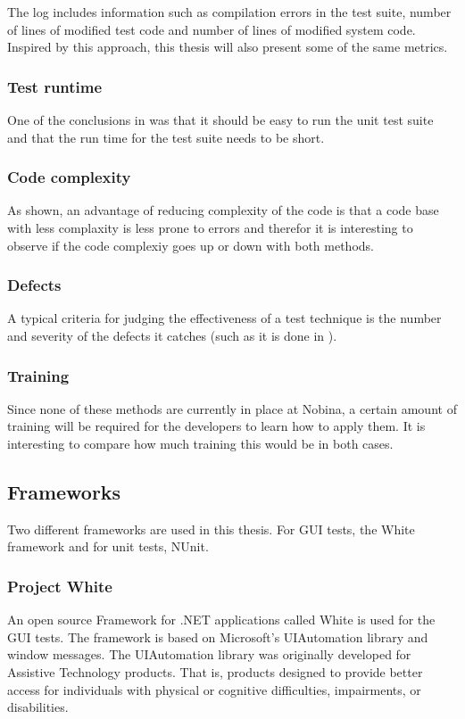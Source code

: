\documentclass{article}
\begin{document}
			The log includes information such as compilation errors in the test
			suite, number of lines of modified test code and number of lines of modified system code. Inspired by this approach, this thesis will also present some of the same metrics.

			\subsubsection{Test runtime}
			One of the conclusions in \cite{unit} was that it should be easy to run the unit test suite and that the run time for the test suite needs to be short. 

			\subsubsection{Code complexity}
			As shown, an advantage of reducing complexity of the code is that a code base with less complaxity is less prone to errors and therefor it is interesting to observe if the code complexiy goes up or down with both methods.   

			\subsubsection{Defects}
			A typical criteria for judging the effectiveness of a test technique is the number and severity of the defects it catches (such as it is done in \cite{unit}). 

			\subsubsection{Training}
			Since none of these methods are currently in place at Nobina, a certain amount of training will be required for the developers to learn how to apply them. It is interesting to compare how much training this would be in both cases.

		\subsection{Frameworks}

			Two different frameworks are used in this thesis. For GUI tests, the White framework and for unit tests, NUnit. 

			\subsubsection{Project White}
			An open source Framework for .NET applications called White is used for the GUI tests. The framework is based on Microsoft's UIAutomation library and window messages. The UIAutomation library was originally developed for Assistive Technology products. That is, products designed to provide better access for individuals with physical or cognitive difficulties, impairments, or disabilities. \cite{white}
\end{document}
